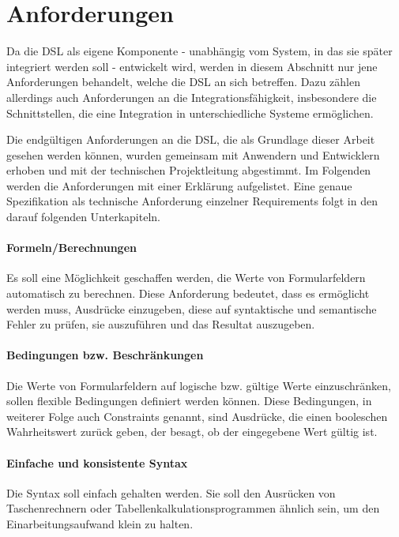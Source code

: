 \section{Anforderungen}

Da die DSL als eigene Komponente - unabhängig vom System, in das sie später integriert werden soll - entwickelt wird, werden in diesem Abschnitt nur jene Anforderungen behandelt, welche die DSL an sich betreffen. Dazu zählen allerdings auch Anforderungen an die Integrationsfähigkeit, insbesondere die Schnittstellen, die eine Integration in unterschiedliche Systeme ermöglichen.

Die endgültigen Anforderungen an die DSL, die als Grundlage dieser Arbeit gesehen werden können, wurden gemeinsam mit Anwendern und Entwicklern erhoben und mit der technischen Projektleitung abgestimmt. Im Folgenden werden die Anforderungen mit einer Erklärung aufgelistet. Eine genaue Spezifikation als technische Anforderung einzelner Requirements folgt in den darauf folgenden Unterkapiteln.


\label{par:ana-anf-formeln}
\paragraph*{Formeln/Berechnungen}
Es soll eine Möglichkeit geschaffen werden, die Werte von Formularfeldern automatisch zu berechnen. Diese Anforderung bedeutet, dass es ermöglicht werden muss, Ausdrücke einzugeben, diese auf syntaktische und semantische Fehler zu prüfen, sie auszuführen und das Resultat auszugeben.

\paragraph*{Bedingungen bzw. Beschränkungen}
Die Werte von Formularfeldern auf logische bzw. gültige Werte einzuschränken, sollen flexible Bedingungen definiert werden können. Diese Bedingungen, in weiterer Folge auch Constraints genannt, sind Ausdrücke, die einen booleschen Wahrheitswert zurück geben, der besagt, ob der eingegebene Wert gültig ist.

\paragraph*{Einfache und konsistente Syntax}
Die Syntax soll einfach gehalten werden. Sie soll den Ausrücken von Taschenrechnern oder Tabellenkalkulationsprogrammen ähnlich sein, um den Einarbeitungsaufwand klein zu halten.

